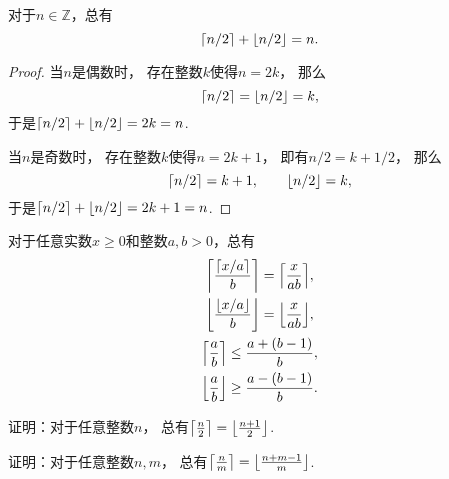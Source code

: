 \begin{property}
对于\(n\in\mathbb{Z}\)，总有\begin{equation}
	\ceil{n/2} + \floor{n/2} = n.
\end{equation}
\begin{proof}
当\(n\)是偶数时，
存在整数\(k\)使得\(n=2k\)，
那么\begin{equation*}
	\ceil{n/2} = \floor{n/2} = k,
\end{equation*}
于是\(\ceil{n/2} + \floor{n/2} = 2k = n\).

当\(n\)是奇数时，
存在整数\(k\)使得\(n=2k+1\)，
即有\(n/2 = k + 1/2\)，
那么\begin{equation*}
	\ceil{n/2} = k+1,
	\qquad
	\floor{n/2} = k,
\end{equation*}
于是\(\ceil{n/2} + \floor{n/2} = 2k+1 = n\).
\end{proof}
\end{property}

\begin{property}
对于任意实数\(x \geq 0\)和整数\(a,b>0\)，总有\begin{gather}
	\ceil*{\frac{\ceil{x/a}}{b}} = \ceil*{\frac{x}{ab}}, \\
	\floor*{\frac{\floor{x/a}}{b}} = \floor*{\frac{x}{ab}}, \\
	\ceil*{\frac{a}{b}} \leq \frac{a+(b-1)}{b}, \\
	\floor*{\frac{a}{b}} \geq \frac{a-(b-1)}{b}.
\end{gather}
\end{property}

\begin{example}
证明：对于任意整数\(n\)，
总有\(\ceil*{\frac{n}2\vphantom{\frac12}} = \floor*{\frac{n+1}2}\).
\end{example}
\begin{example}
证明：对于任意整数\(n,m\)，
总有\(\ceil*{\frac{n}{m}\vphantom{\frac12}} = \floor*{\frac{n+m-1}{m}}\).
\end{example}
